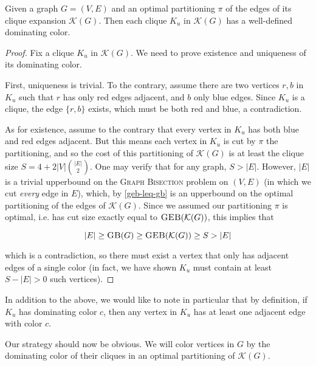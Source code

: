 \documentclass{article}
\newcommand{\gb}{\textsc{Graph \allowbreak Bisection} }
\newcommand{\sgeb}{\textsc{GEB} }
\newcommand{\sgb}{\textsc{GB} }
\begin{document}
	\begin{lemma}
		\label{dom-col}
		Given a graph $G = (V, E)$ and an optimal partitioning $\pi$
		of the edges of its clique
		expansion $\mathcal{K}(G)$. Then each clique $K_u$ in $\mathcal{K}(G)$
		has a well-defined dominating color.
	\end{lemma}
	\begin{proof}
		Fix a clique $K_u$ in $\mathcal{K}(G)$. We need to prove existence and
		uniqueness of its dominating color.

		First, uniqueness is trivial. To the contrary, assume there are two
		vertices $r, b$ in $K_u$ such that $r$ has only red edges adjacent,
		and $b$ only blue edges. Since $K_u$ is a clique, the edge $\{r, b\}$
		exists, which must be both red and blue, a contradiction.

		As for existence, assume to the contrary that every vertex in $K_u$
		has both blue and red edges adjacent. But this means each vertex in
		$K_u$ is cut by $\pi$ the partitioning, and so the cost of
		this partitioning of $\mathcal{K}(G)$ is at least the clique size
		$S = 4+2|V|\binom{|E|}{2}$. One may verify that for any graph,
		$S > |E|$. However, $|E|$ is a trivial upperbound on the \gb problem
		on $(V, E)$ (in which we cut \textit{every} edge in $E$),
		which, by \autoref{geb-leq-gb} is an upperbound on the optimal
		partitioning of the edges of $\mathcal{K}(G)$. Since we assumed our
		partitioning $\pi$ is optimal, i.e. has cut size
		exactly equal to $\sgeb(\mathcal{K}(G))$, this implies that

		$$|E| \geq \sgb(G) \geq \sgeb(\mathcal{K}(G)) \geq S > |E|$$

		which is a contradiction, so there must exist a vertex that only has
		adjacent edges of a single color (in fact, we have shown $K_u$ must
		contain at least $S - |E| > 0$ such vertices).
	\end{proof}

	In addition to the above, we would like to note in particular that by
	definition, if $K_u$ has dominating color $c$, then any vertex in $K_u$
	has at least one adjacent edge with color $c$.

	Our strategy should now be obvious. We will color vertices in $G$ by
	the dominating color of their cliques in an optimal partitioning of
	$\mathcal{K}(G)$.
\end{document}

